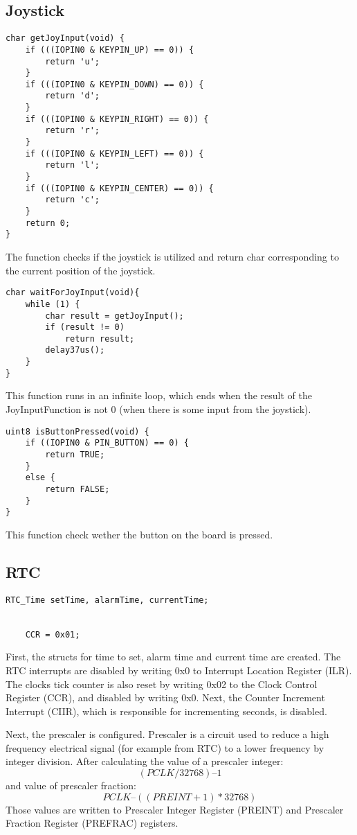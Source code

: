 \documentclass[10pt]{article}
\begin{document}
    \subsection{Joystick}
    	\begin{lstlisting}[caption = {Joystick get input function}]
char getJoyInput(void) {
    if (((IOPIN0 & KEYPIN_UP) == 0)) {
		return 'u';
	}
	if (((IOPIN0 & KEYPIN_DOWN) == 0)) {
		return 'd';
	}
	if (((IOPIN0 & KEYPIN_RIGHT) == 0)) {
		return 'r';
	}
	if (((IOPIN0 & KEYPIN_LEFT) == 0)) {
		return 'l';
	}
	if (((IOPIN0 & KEYPIN_CENTER) == 0)) {
		return 'c';
	}
    return 0;
}
	\end{lstlisting}
	The function checks if the joystick is utilized and return char corresponding to the current position of the joystick.

	\begin{lstlisting}[caption = {Await joystick input function}]
char waitForJoyInput(void){
	while (1) {
		char result = getJoyInput();
		if (result != 0)
			return result;
		delay37us();
	}
}
	\end{lstlisting}
This function runs in an infinite loop, which ends when the result of the JoyInputFunction is not 0 (when there is some input from the joystick).

	\begin{lstlisting}[caption = {Get button input function}]
uint8 isButtonPressed(void) {
	if ((IOPIN0 & PIN_BUTTON) == 0) {
		return TRUE;
	}
	else {
		return FALSE;
	}
}
	\end{lstlisting}
This function check wether the button on the board is pressed.

    \subsection{RTC}
	\begin{lstlisting}[caption = {RTC initialization}]
	RTC_Time setTime, alarmTime, currentTime;


    CCR = 0x01;
	\end{lstlisting}

	First, the structs for time to set, alarm time and current time are created. The RTC interrupts are disabled by writing 0x0 to Interrupt Location Register (ILR).  The clocks tick counter is also reset by writing 0x02 to the Clock Control Register (CCR), and disabled by writing 0x0. Next, the Counter Increment Interrupt (CIIR), which is responsible for incrementing seconds, is disabled. 

Next, the prescaler is configured. Prescaler is a circuit used to reduce a high frequency electrical signal (for example from RTC) to a lower frequency by integer division. After calculating the value of a prescaler integer:
\[ (PCLK/32768) – 1 \]
and value of prescaler fraction:
\[ PCLK – ((PREINT + 1) * 32768) \]
Those values are written to Prescaler Integer Register (PREINT) and Prescaler Fraction Register (PREFRAC) registers.
\end{document}
